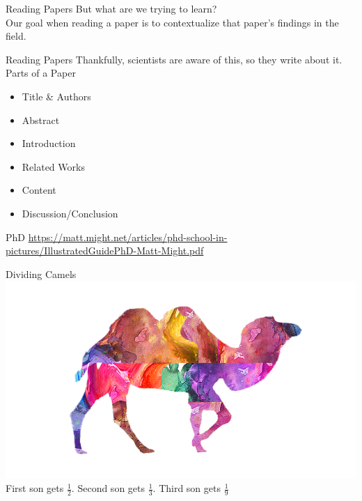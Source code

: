 \documentclass[aspectratio=169,xcolor=dvipsnames]{beamer}
\begin{document}
\begin{frame}{Reading Papers}
	But what are we trying to learn?\\\pause
	Our goal when reading a paper is to contextualize that paper's findings in the field.
\end{frame}
\begin{frame}{Reading Papers}
	Thankfully, scientists are aware of this, so they write about it.\pause
	\\Parts of a Paper
	\begin{itemize}
		\item Title \& Authors \pause
		\item Abstract \pause
		\item Introduction \pause
		\item Related Works \pause
		\item Content\pause
		\item Discussion/Conclusion
	\end{itemize}
\end{frame}
\begin{frame}{PhD}
	\url{https://matt.might.net/articles/phd-school-in-pictures/IllustratedGuidePhD-Matt-Might.pdf}
\end{frame}
 
\begin{frame}{Dividing Camels}
	\includegraphics[width=0.78\linewidth]{Camel}\\
	First son gets $\frac{1}{2}$. Second son gets $\frac{1}{3}$. Third son gets $\frac{1}{9}$
\end{frame}
\end{document}
